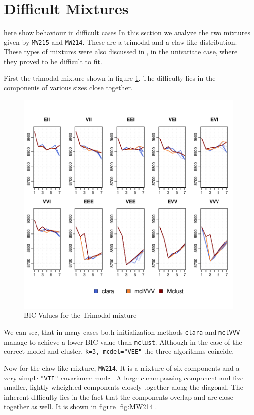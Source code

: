 \section{Difficult Mixtures}

here show behaviour in difficult cases
In this section we analyze the two mixtures given by {\tt MW215} and {\tt MW214}.
These are a trimodal and a claw-like distribution. These types of mixtures were 
also discussed in \cite{Mar92}, in the univariate case, where they proved to be 
difficult to fit.

First the trimodal mixture shown in figure \ref{fig:trimod}. The difficulty 
lies in the components of various sizes close together.


\begin{figure}[h!]
    \centering
\includegraphics{chapter3-figtrimod}
    \caption{BIC Values for the Trimodal mixture}
    \label{fig:trimod}
\end{figure}

We can see, that in many cases both initialization methods {\tt clara} and
{\tt mclVVV} manage to achieve a lower BIC value than {\tt mclust}. Although in
the case of the correct model and cluster, {\tt k=3, model="VEE"} the three 
algorithms coincide.

Now for the claw-like mixture, {\tt MW214}. It is a mixture of six components
and a very simple {\tt "VII"} covariance model. A large encompassing component
and five smaller, lightly wheighted components closely together along the 
diagonal. The inherent difficulty lies in the fact that the components overlap
and are close together as well. It is shown in figure \ref{fig:MW214}.

